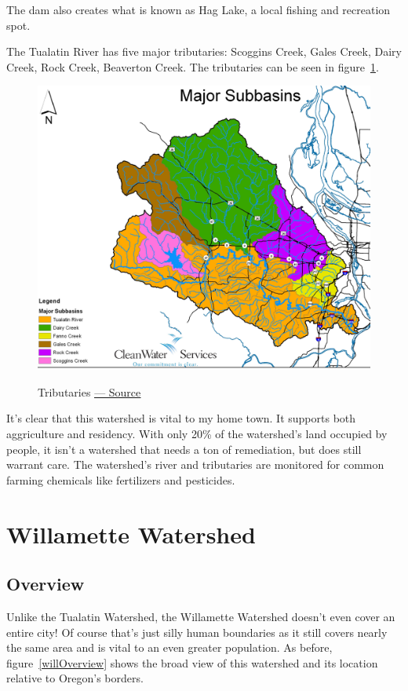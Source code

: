 \documentclass{article}
\begin{document}
The dam also creates what is known as Hag Lake, a local fishing and recreation spot.

The Tualatin River has five major tributaries: Scoggins Creek, Gales Creek, Dairy Creek, Rock Creek, Beaverton Creek.
The tributaries can be seen in figure~\ref{tributaries}.


\begin{figure}[H]
\centering{}
\caption{Tributaries \href{http://tualatinriverkeepers.org/wp-content/uploads/2016/09/TRKWaterTrailBig2016.png}{\underline{--- Source}}}
\includegraphics[width=\textwidth]{tualatinTributaries}\label{tributaries}
\end{figure}

It's clear that this watershed is vital to my home town. It supports both aggriculture and residency. With only 20\% 
of the watershed's land occupied by people, it isn't a watershed that needs a ton of remediation, but does still 
warrant care. The watershed's river and tributaries are monitored for common farming chemicals like fertilizers and
pesticides.

\section{Willamette Watershed}
\subsection{Overview}
Unlike the Tualatin Watershed, the Willamette Watershed doesn't even cover an entire city! Of course that's just silly 
human boundaries as it still covers nearly the same area and is vital to an even greater population. As before, figure~\ref{willOverview} shows the broad view of this watershed and its location relative to Oregon's borders.
\end{document}
